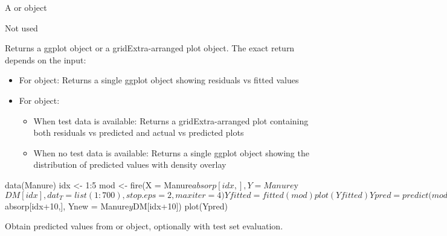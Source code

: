 \documentclass[a4paper]{book}
\begin{document}
%
\begin{Arguments}
\begin{ldescription}
\item[\code{x}] A  or  object

\item[\code{...}] Not used
\end{ldescription}
\end{Arguments}
%
\begin{Value}
Returns a ggplot object or a gridExtra-arranged plot object.
The exact return depends on the input:
\begin{itemize}

\item{} For  object: Returns a single ggplot object showing residuals vs fitted values
\item{} For  object:
\begin{itemize}

\item{} When test data is available: Returns a gridExtra-arranged plot containing both
residuals vs predicted and actual vs predicted plots
\item{} When no test data is available: Returns a single ggplot object showing
the distribution of predicted values with density overlay

\end{itemize}


\end{itemize}

\end{Value}
%
\begin{Examples}
\begin{ExampleCode}
data(Manure)
idx <- 1:5
mod <- fire(X = Manure$absorp[idx,], Y = Manure$y$DM[idx],
 dat_T = list(1:700), stop.eps = 2, maxiter = 4)

Yfitted = fitted(mod)
plot(Yfitted)

Ypred = predict(mod, newdata = Manure$absorp[idx+10,],
Ynew = Manure$y$DM[idx+10])
plot(Ypred)
\end{ExampleCode}
\end{Examples}
%
\begin{Description}
Obtain predicted values from  or  object, optionally with test set evaluation.
\end{Description}
\end{document}
